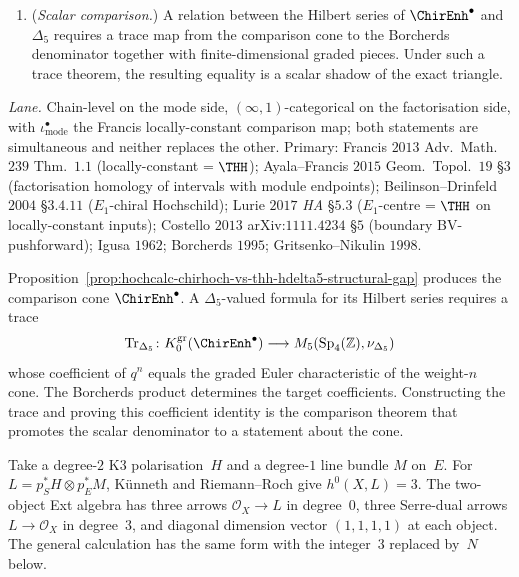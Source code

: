 \begin{proposition}
\begin{enumerate}[label=(\roman*),leftmargin=1.5em]
 degree by degree.
 \item (\emph{Scalar comparison.})  A relation between the Hilbert
 series of $\ChirEnh^\bullet$ and $\Delta_5$ requires a trace map from
 the comparison cone to the Borcherds denominator together with
 finite-dimensional graded pieces.  Under such a trace theorem, the
 resulting equality is a scalar shadow of the exact triangle.
\end{enumerate}
\emph{Lane.} Chain-level on the mode side, $(\infty,1)$-categorical on
the factorisation side, with $\iota^\bullet_{\mathrm{mode}}$ the
Francis locally-constant comparison map; both statements are
simultaneous and neither replaces the other. Primary:
Francis $2013$ Adv.\ Math.\ $239$ Thm.\ $1.1$ (locally-constant = $\THH$);
Ayala--Francis $2015$ Geom.\ Topol.\ $19$ \S$3$ (factorisation
homology of intervals with module endpoints);
Beilinson--Drinfeld $2004$ \S$3.4.11$ ($E_1$-chiral Hochschild);
Lurie $2017$ \emph{HA} \S$5.3$ ($E_1$-centre = $\THH$ on locally-constant
inputs);
Costello $2013$ arXiv:$1111.4234$ \S$5$ (boundary BV-pushforward);
Igusa $1962$; Borcherds $1995$; Gritsenko--Nikulin $1998$.
\end{proposition}

\begin{remark}
\label{rem:hochcalc-chirhoch-thh-delta5-shape-not-e1-shape}
Proposition~\ref{prop:hochcalc-chirhoch-vs-thh-hdelta5-structural-gap}
produces the comparison cone $\ChirEnh^\bullet$.  A
$\Delta_5$-valued formula for its Hilbert series requires a trace
\[
 \operatorname{Tr}_{\Delta_5}\colon
 K_0^{\mathrm{gr}}(\ChirEnh^\bullet)
 \longrightarrow M_5(\mathrm{Sp}_4(\mathbb Z),\nu_{\Delta_5})
\]
whose coefficient of $q^n$ equals the graded Euler characteristic of
the weight-$n$ cone.  The Borcherds product determines the target
coefficients.  Constructing the trace and proving this coefficient
identity is the comparison theorem that promotes the scalar
denominator to a statement about the cone.
\end{remark}

Take a degree-$2$ K3 polarisation~$H$ and a degree-$1$ line bundle
$M$ on~$E$.  For
$L=p_S^*H\otimes p_E^*M$, K\"unneth and Riemann--Roch give
$h^0(X,L)=3$.  The two-object Ext algebra has three arrows
$\mathcal O_X\to L$ in degree~$0$, three Serre-dual arrows
$L\to\mathcal O_X$ in degree~$3$, and diagonal dimension vector
$(1,1,1,1)$ at each object.  The general calculation has the same
form with the integer~$3$ replaced by~$N$ below.


